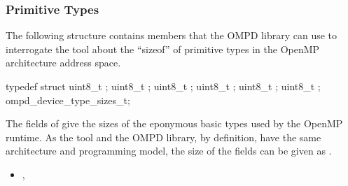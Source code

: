 \subsubsection{Primitive Types}
\label{subsubsec:ompd_device_type_sizes_t}
The following structure contains members that the OMPD library can use
to interrogate the tool about the ``sizeof'' of primitive types in the OpenMP architecture
address space.

\format

\begin{ccppspecific}
\begin{ompSyntax}
typedef struct {
  uint8_t ;
  uint8_t ;
  uint8_t ;
  uint8_t ;
  uint8_t ;
  uint8_t ;
} ompd_device_type_sizes_t;
\end{ompSyntax}
\end{ccppspecific}


\descr
The fields of  give the sizes of
the eponymous basic types used by the OpenMP runtime.
As the tool and the OMPD library, by definition, have the same
architecture and programming model, the size of the fields can be given
as .

\crossreferences
\begin{itemize}
	\item
	, 
\end{itemize}
